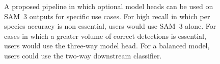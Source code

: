 \begin{figure}[H]
    \caption[Segmentation-Classification Pipeline]{A proposed pipeline in which optional model heads can be used on SAM~3 outputs for specific use cases. For high recall in which per species accuracy is non essential, users would use SAM~3 alone. For cases in which a greater volume of correct detections is essential, users would use the three-way model head. For a balanced model, users could use the two-way downstream classifier.}
    \label{fig:pipeline}
\end{figure}